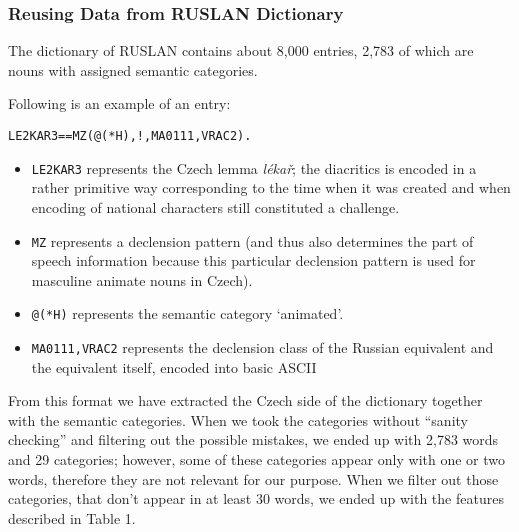 \documentclass[letterpaper]{article}
\begin{document}
\subsubsection{Reusing Data from RUSLAN Dictionary}

The dictionary of RUSLAN contains about 8,000 entries, 2,783 of which are nouns with assigned semantic categories.

Following is an example of an entry:

\begin{verbatim}
LE2KAR3==MZ(@(*H),!,MA0111,VRAC2).
\end{verbatim}

\begin{itemize}
\item \texttt{LE2KAR3} represents the Czech lemma \emph{l\'{e}ka\v{r}}; the diacritics is encoded in a rather primitive way corresponding to the time when it was created and when encoding of national characters still constituted a challenge.
\item \texttt{MZ} represents a declension pattern (and thus also determines the part of speech information because this particular declension pattern is used for masculine animate nouns in Czech).
\item \texttt{@(*H)} represents the semantic category `animated'.
\item \texttt{MA0111,VRAC2} represents the declension class of the Russian equivalent and the equivalent itself, encoded into basic ASCII
\end{itemize}

From this format we have extracted the Czech side of the dictionary together with the semantic categories. 
When we took the categories without ``sanity checking'' and filtering out the possible mistakes, 
we ended up with 2,783 words and 29 categories; however, some of these categories appear only with one or two words, 
therefore they are not relevant for our purpose. When we filter out those categories, that don't appear in at least 30 words, we ended up with the features described in Table 1.
\end{document}
